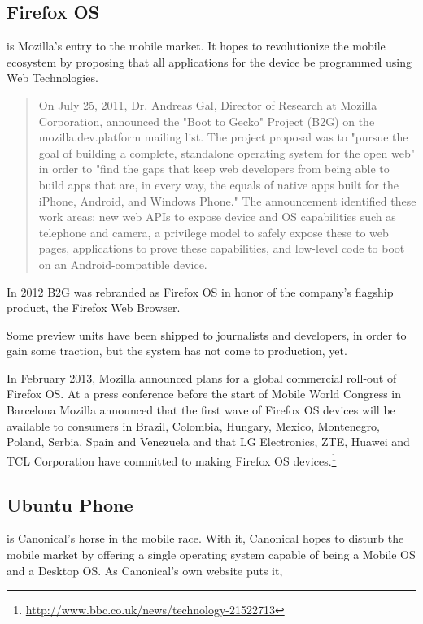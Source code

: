 \subsection{Firefox OS}
 is Mozilla's entry to the mobile market. It hopes to revolutionize the mobile ecosystem by proposing that all applications for the device be programmed using Web Technologies.

\begin{quotation}
On July 25, 2011, Dr. Andreas Gal, Director of Research at Mozilla Corporation, announced the "Boot to Gecko" Project (B2G) on the mozilla.dev.platform mailing list. The project proposal was to "pursue the goal of building a complete, standalone operating system for the open web" in order to "find the gaps that keep web developers from being able to build apps that are, in every way, the equals of native apps built for the iPhone, Android, and Windows Phone." The announcement identified these work areas: new web APIs to expose device and \ac{OS} capabilities such as telephone and camera, a privilege model to safely expose these to web pages, applications to prove these capabilities, and low-level code to boot on an Android-compatible device.
\cite{wikipedia:firefox}
\end{quotation}

In 2012 B2G was rebranded as Firefox OS in honor of the company's flagship product, the Firefox Web Browser.

Some preview units have been shipped to journalists and developers, in order to gain some traction, but the system has not come to production, yet. 

In February 2013, Mozilla announced plans for a global commercial roll-out of Firefox OS. At a press conference before the start of Mobile World Congress in Barcelona Mozilla announced that the first wave of Firefox OS devices will be available to consumers in Brazil, Colombia, Hungary, Mexico, Montenegro, Poland, Serbia, Spain and Venezuela and that LG Electronics, ZTE, Huawei and TCL Corporation have committed to making Firefox OS devices.\footnote{\url{http://www.bbc.co.uk/news/technology-21522713}}
 

\subsection{Ubuntu Phone}
 is Canonical's horse in the mobile race. With it, Canonical hopes to disturb the mobile market by offering a single operating system capable of being a Mobile \ac{OS} and a Desktop \ac{OS}. As Canonical's own website puts it, 

